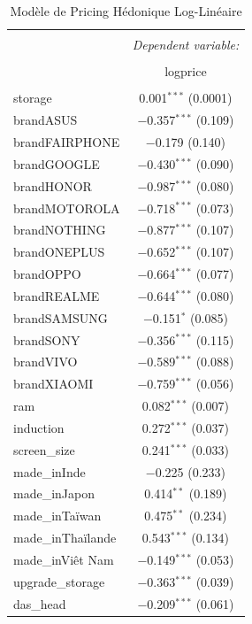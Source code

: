 \documentclass[
  12pt,
]{report}
\begin{document}
\begin{table}[!htbp] \centering 
  \caption{Modèle de Pricing Hédonique Log-Linéaire } 
  \label{} 
\footnotesize 
\begin{tabular}{@{\extracolsep{5pt}}lc} 
\\[-1.8ex]\hline 
\hline \\[-1.8ex] 
 & \multicolumn{1}{c}{\textit{Dependent variable:}} \\ 
\cline{2-2} 
\\[-1.8ex] & logprice \\ 
\hline \\[-1.8ex] 
 storage & 0.001$^{***}$ (0.0001) \\ 
  brandASUS & $-$0.357$^{***}$ (0.109) \\ 
  brandFAIRPHONE & $-$0.179 (0.140) \\ 
  brandGOOGLE & $-$0.430$^{***}$ (0.090) \\ 
  brandHONOR & $-$0.987$^{***}$ (0.080) \\ 
  brandMOTOROLA & $-$0.718$^{***}$ (0.073) \\ 
  brandNOTHING & $-$0.877$^{***}$ (0.107) \\ 
  brandONEPLUS & $-$0.652$^{***}$ (0.107) \\ 
  brandOPPO & $-$0.664$^{***}$ (0.077) \\ 
  brandREALME & $-$0.644$^{***}$ (0.080) \\ 
  brandSAMSUNG & $-$0.151$^{*}$ (0.085) \\ 
  brandSONY & $-$0.356$^{***}$ (0.115) \\ 
  brandVIVO & $-$0.589$^{***}$ (0.088) \\ 
  brandXIAOMI & $-$0.759$^{***}$ (0.056) \\ 
  ram & 0.082$^{***}$ (0.007) \\ 
  induction & 0.272$^{***}$ (0.037) \\ 
  screen\_size & 0.241$^{***}$ (0.033) \\ 
  made\_inInde & $-$0.225 (0.233) \\ 
  made\_inJapon & 0.414$^{**}$ (0.189) \\ 
  made\_inTaïwan & 0.475$^{**}$ (0.234) \\ 
  made\_inThaïlande & 0.543$^{***}$ (0.134) \\ 
  made\_inViêt Nam & $-$0.149$^{***}$ (0.053) \\ 
  upgrade\_storage & $-$0.363$^{***}$ (0.039) \\ 
  das\_head & $-$0.209$^{***}$ (0.061) \\ 

\end{tabular}
\end{table}
\end{document}
